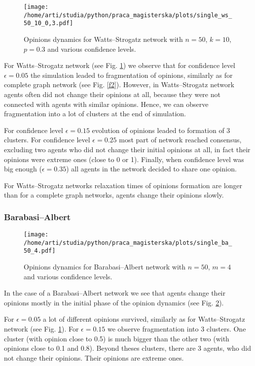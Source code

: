 \documentclass[a4paper, 12pt]{article}
\begin{document}
\begin{figure}[H]
		\centering
		\texttt{[image: /home/arti/studia/python/praca\_magisterska/plots/single\_ws\_50\_10\_0,3.pdf]}
		\caption{Opinions dynamics for Watts--Strogatz network with $n=50$, $k=10$, $p=0.3$ and various confidence levels.}
		\label{f3}
\end{figure}
For Watts--Strogatz network (see Fig. \ref{f3}) we observe that for confidence level $\epsilon=0.05$ the simulation leaded to fragmentation of opinions, similarly as for complete graph network (see Fig. \ref{f2}). However, in Watts--Strogatz network agents often did not change their opinions at all, because they were not connected with agents with similar opinions. Hence, we can observe fragmentation into a lot of clusters at the end of simulation.
\indent

For confidence level $\epsilon=0.15$ evolution of opinions leaded to formation of 3 clusters. For confidence level $\epsilon=0.25$ most part of network reached consensus, excluding two agents who did not change their initial opinions at all, in fact their opinions were extreme ones (close to 0 or 1). Finally, when confidence level was big enough ($\epsilon=0.35$) all agents in the network decided to share one opinion.
\indent

For Watts--Strogatz networks relaxation times of opinions formation are longer than for a complete graph networks, agents change their opinions slowly.

\subsubsection{Barabasi--Albert}

\begin{figure}[H]
		\centering
		\texttt{[image: /home/arti/studia/python/praca\_magisterska/plots/single\_ba\_50\_4.pdf]}
		\caption{Opinions dynamics for Barabasi--Albert network with $n=50$, $m=4$ and various confidence levels.}
		\label{f4}
\end{figure}
In the case of a Barabasi--Albert network we see that agents change their opinions mostly in the initial phase of the opinion dynamics (see Fig. \ref{f4}). 
\indent

For $\epsilon=0.05$ a lot of different opinions survived, similarly as for Watts--Strogatz network (see Fig. \ref{f3}). For $\epsilon=0.15$ we observe fragmentation into 3 clusters. One cluster (with opinion close to 0.5) is much bigger than the other two (with opinions close to 0.1 and 0.8). Beyond theses clusters, there are 3 agents, who did not change their opinions. Their opinions are extreme ones.
\indent
\end{document}
